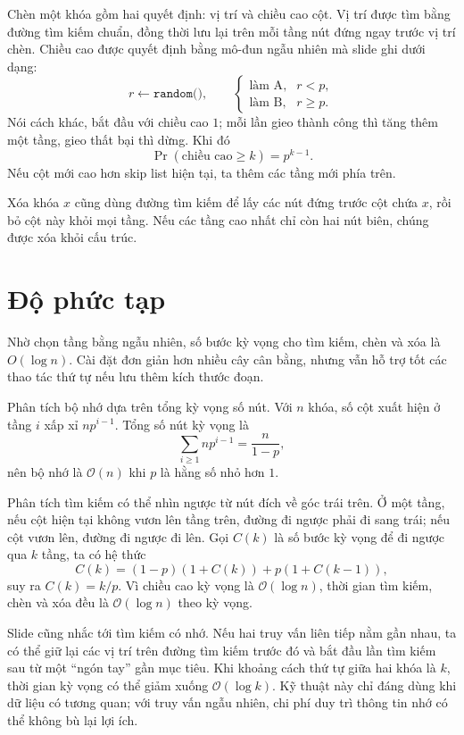 \documentclass[11pt]{article}
\newcommand{\Oh}{\mathcal{O}}
\newcommand{\Prob}{\mathop{\mathrm{Pr}}}
\begin{document}
Chèn một khóa gồm hai quyết định: vị trí và chiều cao cột. Vị trí được tìm
bằng đường tìm kiếm chuẩn, đồng thời lưu lại trên mỗi tầng nút đứng ngay
trước vị trí chèn. Chiều cao được quyết định bằng mô-đun ngẫu nhiên mà slide
ghi dưới dạng:
\[
  r\leftarrow \texttt{random()},\qquad
  \begin{cases}
    \text{làm A},& r<p,\\
    \text{làm B},& r\ge p.
  \end{cases}
\]
Nói cách khác, bắt đầu với chiều cao \(1\); mỗi lần gieo thành công thì tăng
thêm một tầng, gieo thất bại thì dừng. Khi đó
\[
  \Prob(\text{chiều cao}\ge k)=p^{k-1}.
\]
Nếu cột mới cao hơn skip list hiện tại, ta thêm các tầng mới phía trên.

Xóa khóa \(x\) cũng dùng đường tìm kiếm để lấy các nút đứng trước cột chứa
\(x\), rồi bỏ cột này khỏi mọi tầng. Nếu các tầng cao nhất chỉ còn hai nút
biên, chúng được xóa khỏi cấu trúc.

\section{Độ phức tạp}

Nhờ chọn tầng bằng ngẫu nhiên, số bước kỳ vọng cho tìm kiếm, chèn và xóa là
\(O(\log n)\). Cài đặt đơn giản hơn nhiều cây cân bằng, nhưng vẫn hỗ trợ tốt
các thao tác thứ tự nếu lưu thêm kích thước đoạn.

Phân tích bộ nhớ dựa trên tổng kỳ vọng số nút. Với \(n\) khóa, số cột xuất
hiện ở tầng \(i\) xấp xỉ \(n p^{i-1}\). Tổng số nút kỳ vọng là
\[
  \sum_{i\ge 1} n p^{i-1}=\frac{n}{1-p},
\]
nên bộ nhớ là \(\Oh(n)\) khi \(p\) là hằng số nhỏ hơn \(1\).

Phân tích tìm kiếm có thể nhìn ngược từ nút đích về góc trái trên. Ở một tầng,
nếu cột hiện tại không vươn lên tầng trên, đường đi ngược phải đi sang trái;
nếu cột vươn lên, đường đi ngược đi lên. Gọi \(C(k)\) là số bước kỳ vọng để
đi ngược qua \(k\) tầng, ta có hệ thức
\[
  C(k)=(1-p)(1+C(k))+p(1+C(k-1)),
\]
suy ra \(C(k)=k/p\). Vì chiều cao kỳ vọng là \(\Oh(\log n)\), thời gian tìm
kiếm, chèn và xóa đều là \(\Oh(\log n)\) theo kỳ vọng.

Slide cũng nhắc tới tìm kiếm có nhớ. Nếu hai truy vấn liên tiếp nằm gần nhau,
ta có thể giữ lại các vị trí trên đường tìm kiếm trước đó và bắt đầu lần tìm
kiếm sau từ một ``ngón tay'' gần mục tiêu. Khi khoảng cách thứ tự giữa hai
khóa là \(k\), thời gian kỳ vọng có thể giảm xuống \(\Oh(\log k)\). Kỹ thuật
này chỉ đáng dùng khi dữ liệu có tương quan; với truy vấn ngẫu nhiên, chi phí
duy trì thông tin nhớ có thể không bù lại lợi ích.
\end{document}
